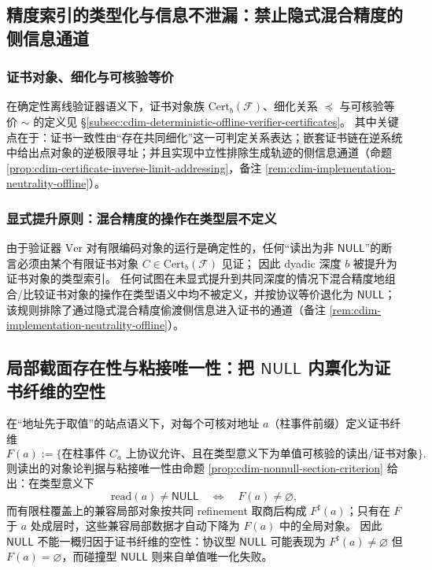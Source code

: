 \subsection{精度索引的类型化与信息不泄漏：禁止隐式混合精度的侧信息通道}\label{subsec:cdim-typed-precision-no-leak}
\subsubsection{证书对象、细化与可核验等价}
在确定性离线验证器语义下，证书对象族 \(\mathrm{Cert}_b(\mathcal F)\)、细化关系 \(\preceq\) 与可核验等价 \(\sim\) 的定义见 \S\ref{subsec:cdim-deterministic-offline-verifier-certificates}。
其中关键点在于：证书一致性由“存在共同细化”这一可判定关系表达；嵌套证书链在逆系统中给出点对象的逆极限寻址；并且实现中立性排除生成轨迹的侧信息通道（命题 \ref{prop:cdim-certificate-inverse-limit-addressing}，备注 \ref{rem:cdim-implementation-neutrality-offline}）。

\subsubsection{显式提升原则：混合精度的操作在类型层不定义}
\begin{remark}[显式提升原则与混合精度的类型否定]\label{rem:cdim-explicit-lifting-no-mixed-precision}
由于验证器 \(\mathrm{Ver}\) 对有限编码对象的运行是确定性的，任何“读出为非 \(\mathsf{NULL}\)”的断言必须由某个有限证书对象 \(C\in\mathrm{Cert}_b(\mathcal F)\) 见证；
因此 dyadic 深度 \(b\) 被提升为证书对象的类型索引。
任何试图在未显式提升到共同深度的情况下混合精度地组合/比较证书对象的操作在类型语义中均不被定义，并按协议等价退化为 \(\mathsf{NULL}\)；
该规则排除了通过隐式混合精度偷渡侧信息进入证书的通道（备注 \ref{rem:cdim-implementation-neutrality-offline}）。
\end{remark}

\subsection{局部截面存在性与粘接唯一性：把 \texorpdfstring{$\mathsf{NULL}$}{NULL} 内禀化为证书纤维的空性}\label{subsec:cdim-local-section-gluing-null}
在“地址先于取值”的站点语义下，对每个可核对地址 \(a\)（柱事件前缀）定义证书纤维
\[
F(a):=\{\text{在柱事件 }C_a\text{ 上协议允许、且在类型意义下为单值可核验的读出/证书对象}\}.
\]
则读出的对象论判据与粘接唯一性由命题 \ref{prop:cdim-nonnull-section-criterion} 给出：在类型意义下
\[
\mathrm{read}(a)\neq \mathsf{NULL}\quad\Longleftrightarrow\quad F(a)\neq\varnothing,
\]
而有限柱覆盖上的兼容局部对象按共同 refinement 取商后构成 \(F^\sharp(a)\)；只有在 \(F\) 于 \(a\) 处成层时，这些兼容局部数据才自动下降为 \(F(a)\) 中的全局对象。
因此 \(\mathsf{NULL}\) 不能一概归因于证书纤维的空性：协议型 \(\mathsf{NULL}\) 可能表现为 \(F^\sharp(a)\neq\varnothing\) 但 \(F(a)=\varnothing\)，而碰撞型 \(\mathsf{NULL}\) 则来自单值唯一化失败。

